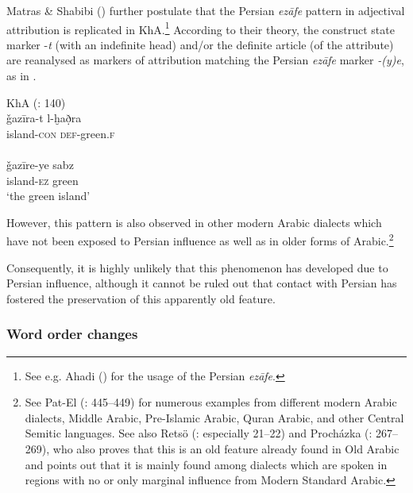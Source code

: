 \documentclass[output=paper,nonflat]{langsci/langscibook}
\begin{document}
Matras \& Shabibi (\citeyear[140]{MatrasShabibi2007}) further postulate that the Persian \textit{ezāfe} pattern in adjectival attribution is replicated in KhA.\footnote{See e.g. Ahadi (\citeyear[103–109]{Ahadi2001}) for the usage of the Persian \textit{ezāfe}.} According to their theory, the construct state marker -\textit{t} (with an indefinite head) and/or the definite article (of the attribute) are reanalysed as markers of attribution matching the Persian  \textit{ezāfe} marker \textit{-(y)e}, as in . 

\ea\label{island}
\ea
{KhA (\citealt{MatrasShabibi2007}: 140)}\\
\gll ǧazīra-t l-ḫað̣ra \\
     island-\textsc{con} \textsc{def}-green.\textsc{f}\\
 
\\
\gll ǧazīre-ye sabz\\
     island-\textsc{ez} green\\
\glt ‘the green island’ 
\z\z

However, this pattern is also observed in other modern Arabic dialects which have not been exposed to Persian influence as well as in older forms of Arabic.\footnote{See Pat-El (\citeyear{Pat-El2017}: 445–449) for numerous examples from different modern Arabic dialects, Middle Arabic, Pre-Islamic Arabic, Quran Arabic, and other Central Semitic languages. See also Retsö (\citeyear{Retsö2009}: especially 21–22) and Procházka (\citeyear{Procházka2018Fertile}: 267–269), who also proves that this is an old feature already found in Old Arabic and points out that it is mainly found among dialects which are spoken in regions with no or only marginal influence from Modern Standard Arabic.} 

Consequently, it is highly unlikely that this phenomenon has developed due to Persian influence, although it cannot be ruled out that contact with Persian has fostered the preservation of this apparently old feature. 


\subsubsection{Word order changes} \label{woc}
\end{document}
